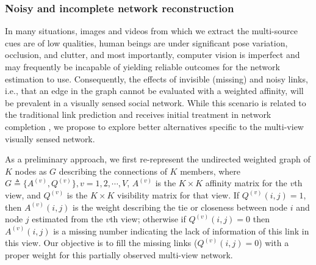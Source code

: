 \subsubsection{Noisy and incomplete network reconstruction}
\label{sec:reconstruct}

In many situations, images and videos from which we extract the multi-source cues are of low qualities, human beings are under significant pose variation, occlusion, and clutter, and most importantly, computer vision is imperfect and may frequently be incapable of yielding reliable outcomes for the network estimation to use. Consequently, the effects of invisible (missing) and noisy links, i.e., that an edge in the graph cannot be evaluated with a weighted affinity, will be prevalent in a visually sensed social network. While this scenario is related to the traditional link prediction \cite{Goldberg,Liben-Nowell,TaskarWAK03} and receives initial treatment in network completion \cite{Clauset,Guimera,HannekeX09,KimL11}, we propose to explore better alternatives specific to the multi-view visually sensed network.

As a preliminary approach, we first re-represent the undirected weighted graph of $K$ nodes as $G$ describing the connections of $K$ members, where $G\triangleq\{A^{(v)}, Q^{(v)}\}, v=1,2,\cdots,V$, $A^{(v)}$ is the $K\times K$ affinity matrix for the $v$th view, and $Q^{(v)}$ is the $K\times K$ visibility matrix for that view. If $Q^{(v)}(i,j)=1$, then $A^{(v)}(i,j)$ is the weight describing the tie or closeness between node $i$ and node $j$ estimated from the $v$th view; otherwise if $Q^{(v)}(i,j)=0$ then $A^{(v)}(i,j)$ is a missing number indicating the lack of information of this link in this view. Our objective is to fill the missing links ($Q^{(v)}(i,j)=0$) with a proper weight for this partially observed multi-view network. 


